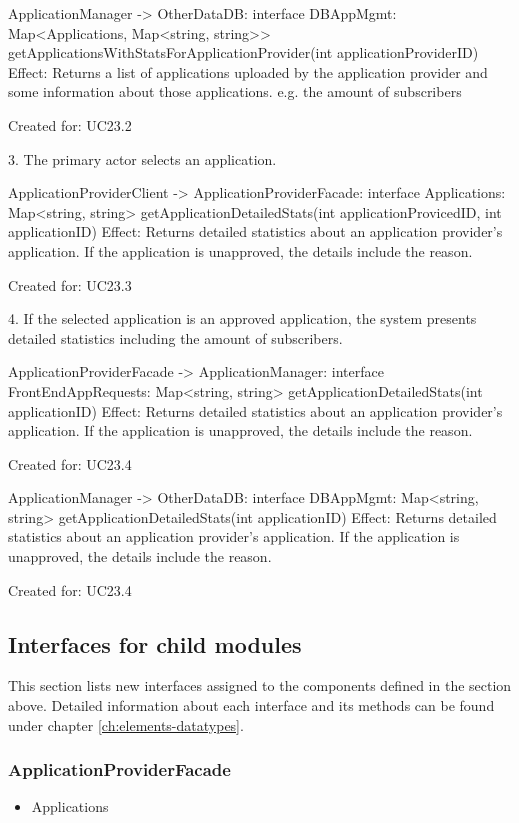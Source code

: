             ApplicationManager -> OtherDataDB: interface DBAppMgmt: Map<Applications, Map<string, string>> getApplicationsWithStatsForApplicationProvider(int applicationProviderID)
                Effect: Returns a list of applications uploaded by the application provider and some information about those applications. e.g. the amount of subscribers
                \item Created for: UC23.2

        3. The primary actor selects an application.

            ApplicationProviderClient -> ApplicationProviderFacade: interface Applications: Map<string, string> getApplicationDetailedStats(int applicationProvicedID, int applicationID)
                Effect: Returns detailed statistics about an application provider's application. If the application is unapproved, the details include the reason.
                \item Created for: UC23.3

        4. If the selected application is an approved application, the system presents detailed statistics including the amount of subscribers.

            ApplicationProviderFacade -> ApplicationManager: interface FrontEndAppRequests: Map<string, string> getApplicationDetailedStats(int applicationID)
                Effect: Returns detailed statistics about an application provider's application. If the application is unapproved, the details include the reason.
                \item Created for: UC23.4

            ApplicationManager -> OtherDataDB: interface DBAppMgmt: Map<string, string> getApplicationDetailedStats(int applicationID)
                Effect: Returns detailed statistics about an application provider's application. If the application is unapproved, the details include the reason.
                \item Created for: UC23.4


\subsection*{Interfaces for child modules}
    This section lists new interfaces assigned to the components defined
    in the section above. Detailed information about each interface and
    its methods can be found under chapter \ref{ch:elements-datatypes}.

    \subsubsection{ApplicationProviderFacade}
        \begin{itemize}
            \item Applications
        \end{itemize}

